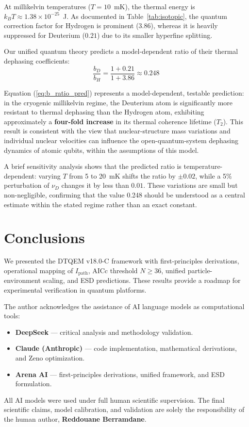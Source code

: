\documentclass[reprint,amsmath,amssymb,aps,pra,superscriptaddress]{revtex4-2}
\begin{document}
At millikelvin temperatures ($T = 10$~mK), the thermal energy is $k_B T \approx 1.38 \times 10^{-25}$~J. As documented in Table~\ref{tab:isotopic}, the quantum correction factor for Hydrogen is prominent ($3.86$), whereas it is heavily suppressed for Deuterium ($0.21$) due to its smaller hyperfine splitting.

Our unified quantum theory predicts a model-dependent ratio of their thermal dephasing coefficients:
\begin{equation}
    \frac{b_D}{b_H} = \frac{1 + 0.21}{1 + 3.86} \approx \mathbf{0.248}
    \label{eq:b_ratio_pred}
\end{equation}

Equation (\ref{eq:b_ratio_pred}) represents a model-dependent, testable prediction: in the cryogenic millikelvin regime, the Deuterium atom is significantly more resistant to thermal dephasing than the Hydrogen atom, exhibiting approximately a \textbf{four-fold increase} in its thermal coherence lifetime ($T_2$). This result is consistent with the view that nuclear-structure mass variations and individual nuclear velocities can influence the open-quantum-system dephasing dynamics of atomic qubits, within the assumptions of this model.

A brief sensitivity analysis shows that the predicted ratio is temperature-dependent: varying $T$ from 5 to 20~mK shifts the ratio by $\pm 0.02$, while a 5\% perturbation of $\nu_D$ changes it by less than $0.01$. These variations are small but non-negligible, confirming that the value 0.248 should be understood as a central estimate within the stated regime rather than an exact constant.

\section{Conclusions}

We presented the DTQEM v18.0-C framework with first-principles derivations, operational mapping of $I_{\text{path}}$, AICc threshold $N \ge 36$, unified particle-environment scaling, and ESD predictions. These results provide a roadmap for experimental verification in quantum platforms.

\begin{acknowledgments}

The author acknowledges the assistance of AI language models as computational tools:
\begin{itemize}
    \item \textbf{DeepSeek} — critical analysis and methodology validation.
    \item \textbf{Claude (Anthropic)} — code implementation, mathematical derivations, and Zeno optimization.
    \item \textbf{Arena AI} — first-principles derivations, unified framework, and ESD formulation.
\end{itemize}
All AI models were used under full human scientific supervision. The final scientific claims, model calibration, and validation are solely the responsibility of the human author, \textbf{Reddouane Berramdane}.

\end{acknowledgments}
\end{document}
